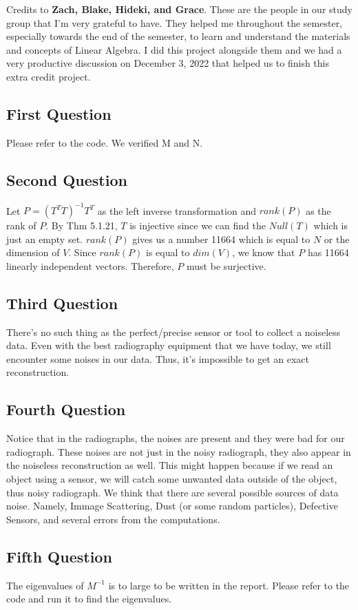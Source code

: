 \documentclass{article}
\begin{document}
Credits to \textbf{Zach, Blake, Hideki, and Grace}. These are the people in our study group that I'm very grateful to have. They helped me throughout the semester, especially towards the end of the semester, to learn and understand the materials and concepts of Linear Algebra. I did this project alongside them and we had a very productive discussion on December 3, 2022 that helped us to finish this extra credit project.
\subsection{First Question}
Please refer to the code. We verified M and N.
\subsection{Second Question}
Let $P = (T^TT)^{-1}T^T$ as the left inverse transformation and $rank(P)$ as the rank of $P$. By Thm 5.1.21, $T$ is injective since we can find the $Null(T)$ which is just an empty set. $rank(P)$ gives us a number 11664 which is equal to $N$ or the dimension of $V$. Since $rank(P)$ is equal to $dim(V)$, we know that $P$ has 11664 linearly independent vectors. Therefore, $P$ must be surjective.

\subsection{Third Question}
There’s no such thing as the perfect/precise sensor or tool to collect a noiseless data. Even with the best radiography equipment that we have today, we still encounter some noises in our data. Thus, it's impossible to get an exact reconstruction.

\subsection{Fourth Question}
Notice that in the radiographs, the noises are present and they were bad for our radiograph. These noises are not just in the noisy radiograph, they also appear in the noiseless reconstruction as well. This might happen because if we read an object using a sensor, we will catch some unwanted data outside of the object, thus noisy radiograph. We think that there are several possible sources of data noise. Namely, Immage Scattering, Dust (or some random particles), Defective Sensors, and several errors from the computations.

\subsection{Fifth Question}
The eigenvalues of $M^{-1}$ is to large to be written in the report. Please refer to the code and run it to find the eigenvalues.
\end{document}
